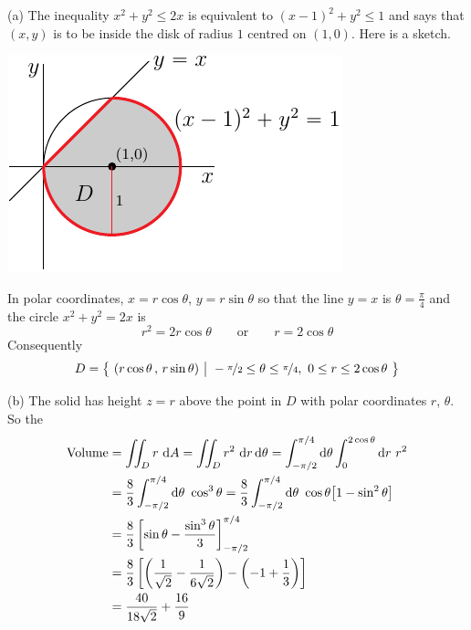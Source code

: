 \begin{solution}
(a) The inequality $x^2 + y^2 \le 2x$ is equivalent to
$(x-1)^2 + y^2 \le 1$ and says that $(x,y)$ is to be inside the disk of
radius $1$ centred on $(1,0)$. Here is a sketch.

\begin{center}
\includegraphics{fig/OE14D_6.pdf}
\end{center}

In polar coordinates, $x=r\cos\theta$, $y=r\sin\theta$ so that 
the line $y=x$ is $\theta=\frac{\pi}{4}$
and the circle $x^2+y^2=2x$ is
\begin{equation*}
r^2=2r\cos\theta \qquad\text{or}\qquad r=2\cos\theta
\end{equation*}
Consequently
\begin{equation*}
D = \big\{ \ (r\cos\theta\,,\,r\sin\theta)\ \big|\ -\nicefrac{\pi}{2}\le\theta\le\nicefrac{\pi}{4},\ 0\le r\le 2\cos\theta\ \big\}
\end{equation*}

(b) The solid has height $z=r$ above the point in $D$ with polar coordinates
     $r$, $\theta$. So the 
\begin{align*}
\text{Volume}
&= \dblInt_D r\ \dee{A}=\dblInt_D r^2\ \dee{r}\, \dee{\theta}
=\int_{-\pi/2}^{\pi/4}\dee{\theta}\int_0^{2\cos\theta} \dee{r}\ r^2 \\
&= \frac{8}{3}\int_{-\pi/2}^{\pi/4}\dee{\theta}\ \cos^3\theta
= \frac{8}{3}\int_{-\pi/2}^{\pi/4}\dee{\theta}\ 
                         \cos\theta\big[1-\sin^2\theta\big] \\
&=\frac{8}{3} \left[\sin\theta -\frac{\sin^3\theta}{3}\right]_{-\pi/2}^{\pi/4}\\
&=\frac{8}{3}\left[\left(\frac{1}{\sqrt{2}} -\frac{1}{6\sqrt{2}}\right)
                   -\left(-1 + \frac{1}{3}\right)  \right] \\
&=\frac{40}{18\sqrt{2}} +\frac{16}{9}
\end{align*}
\end{solution}

